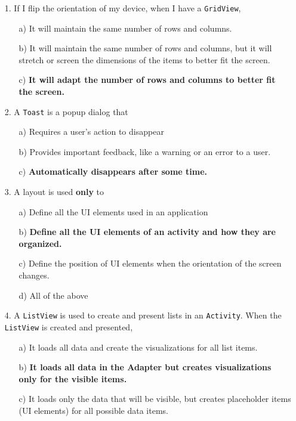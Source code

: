 \documentclass[12pt]{article}
\begin{document}
\begin{itemize}
    \item[1.] If I flip the orientation of my device, when I have a \texttt{GridView},
    \begin{itemize}
        \item[a)] It will maintain the same number of rows and columns.
        \item[b)] It will maintain the same number of rows and columns, but it will stretch or screen the dimensions of the items to better fit the screen.
        \item[c)] \textbf{It will adapt the number of rows and columns to better fit the screen.}
    \end{itemize}
    
    \item[2.] A \texttt{Toast} is a popup dialog that 
    \begin{itemize}
        \item[a)] Requires a user's action to disappear
        \item[b)] Provides important feedback, like a warning or an error to a user.
        \item[c)] \textbf{Automatically disappears after some time.}
    \end{itemize}
   
    \item[3.] A layout is used \textbf{only} to
    \begin{itemize}
        \item[a)] Define all the UI elements used in an application
        \item[b)] \textbf{Define all the UI elements of an activity and how they are organized.}
        \item[c)] Define the position of UI elements when the orientation of the screen changes.
        \item[d)] All of the above
    \end{itemize}
    
    
    \item[4.] A \texttt{ListView} is used to create and present lists in an \texttt{Activity}. When the \texttt{ListView} is created and presented,
    \begin{itemize}
        \item[a)] It loads all data and create the visualizations for all list items.
        \item[b)] \textbf{It loads all data in the Adapter but creates visualizations only for the visible items.}
        \item[c)] It loads only the data that will be visible, but creates placeholder items (UI elements) for all possible data items.
    \end{itemize}
   

\end{itemize}
\end{document}
